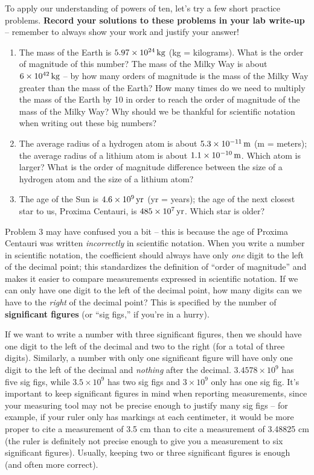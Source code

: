 \documentclass[11pt]{article}
\begin{document}
To apply our understanding of powers of ten, let's try a few short practice problems. \textbf{Record your solutions to these problems in your lab write-up} -- remember to always show your work and justify your answer!
\begin{enumerate}
    \item The mass of the Earth is $5.97 \times 10^{24} \, {\rm kg}$ (kg = kilograms). What is the order of magnitude of this number? The mass of the Milky Way is about $6 \times 10^{42} \, {\rm kg}$ -- by how many orders of magnitude is the mass of the Milky Way greater than the mass of the Earth? How many times do we need to multiply the mass of the Earth by 10 in order to reach the order of magnitude of the mass of the Milky Way? Why should we be thankful for scientific notation when writing out these big numbers?
    
    \item The average radius of a hydrogen atom is about $5.3 \times 10^{-11} \, {\rm m}$ (m = meters); the average radius of a lithium atom is about $1.1 \times 10^{-10} \, {\rm m}$. Which atom is larger? What is the order of magnitude difference between the size of a hydrogen atom and the size of a lithium atom? 
    
    \item The age of the Sun is $4.6 \times 10^9 \, {\rm yr}$ (yr = years); the age of the next closest star to us, Proxima Centauri, is $485 \times 10^{7} \, {\rm yr}$. Which star is older? 
\end{enumerate}

\bigskip

Problem 3 may have confused you a bit -- this is because the age of Proxima Centauri was written \emph{incorrectly} in scientific notation. When you write a number in scientific notation, the coefficient should always have only \emph{one} digit to the left of the decimal point; this standardizes the definition of ``order of magnitude'' and makes it easier to compare measurements expressed in scientific notation. If we can only have one digit to the left of the decimal point, how many digits can we have to the \emph{right} of the decimal point? This is specified by the number of \textbf{significant figures} (or ``sig figs,'' if you're in a hurry). 

If we want to write a number with three significant figures, then we should have one digit to the left of the decimal and two to the right (for a total of three digits). Similarly, a number with only one significant figure will have only one digit to the left of the decimal and \emph{nothing} after the decimal. $3.4578 \times 10^9$ has five sig figs, while $3.5 \times 10^9$ has two sig figs and $3 \times 10^9$ only has one sig fig. It's important to keep significant figures in mind when reporting measurements, since your measuring tool may not be precise enough to justify many sig figs -- for example, if your ruler only has markings at each centimeter, it would be more proper to cite a measurement of 3.5 cm than to cite a measurement of 3.48825 cm (the ruler is definitely not precise enough to give you a measurement to six significant figures). Usually, keeping two or three significant figures is enough (and often more correct).
\end{document}
